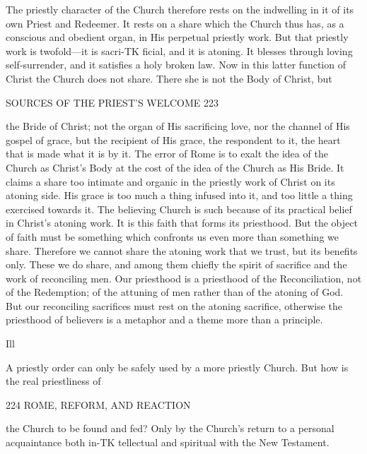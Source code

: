 \documentclass[12pt,a5paper,twoside]{book}
\begin{document}
{{The priestly character of the Church therefore rests 
on the indwelling in it of its own Priest and Redeemer. 
It rests on a share which the Church thus has, as a 
conscious and obedient organ, in His perpetual priestly 
work. But that priestly work is twofold---it is sacri-TK
ficial, and it is atoning. It blesses through loving 
self-surrender, and it satisfies a holy broken law. 
Now in this latter function of Christ the Church does 
not share. There she is not the Body of Christ, but 



SOURCES OF THE PRIEST'S WELCOME 223 

the Bride of Christ; not the organ of His sacrificing 
love, nor the channel of His gospel of grace, but the 
recipient of His grace, the respondent to it, the heart 
that is made what it is by it. The error of Rome is 
to exalt the idea of the Church as Christ's Body at the 
cost of the idea of the Church as His Bride. It 
claims a share too intimate and organic in the priestly 
work of Christ on its atoning side. His grace is too 
much a thing infused into it, and too little a thing 
exercised towards it. The believing Church is such 
because of its practical belief in Christ's atoning work. 
It is this faith that forms its priesthood. But the object 
of faith must be something which confronts us even 
more than something we share. Therefore we cannot 
share the atoning work that we trust, but its benefits 
only. These we do share, and among them chiefly 
the spirit of sacrifice and the work of reconciling men. 
Our priesthood is a priesthood of the Reconciliation, 
not of the Redemption; of the attuning of men rather 
than of the atoning of God. But our reconciling 
sacrifices must rest on the atoning sacrifice, otherwise 
the priesthood of believers is a metaphor and a theme 
more than a principle. 

Ill 

A priestly order can only be safely used by a more 
priestly Church. But how is the real priestliness of 



224 ROME, REFORM, AND REACTION 

the Church to be found and fed? Only by the 
Church's return to a personal acquaintance both in-TK
tellectual and spiritual with the New Testament. 

}}
\end{document}
